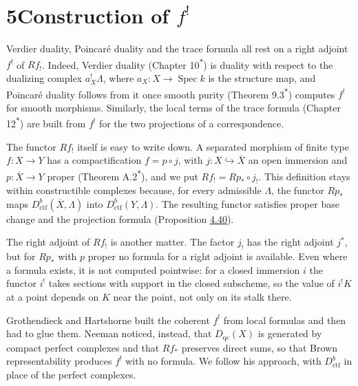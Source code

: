 \documentclass[11pt]{article}
\newcommand{\bpout}[1]{#1\textsuperscript{\hyperlink{bp-outside}{\ensuremath{\ast}}}}
\begin{document}
\section*{\texorpdfstring{5\quad Construction of $f^!$}{5 Construction of f!}}
\label{bp407}%
\label{bp408}%
Verdier duality, Poincaré duality and the trace formula all rest on a right adjoint \(f^!\) of \(Rf_!\). Indeed, Verdier duality (Chapter \bpout{10}) is duality with respect to the dualizing complex \(a_X^!\Lambda\), where \(a_X:X\to\operatorname{Spec}k\) is the structure map, and Poincaré duality follows from it once smooth purity (Theorem \bpout{9.3}) computes \(f^!\) for smooth morphisms. Similarly, the local terms of the trace formula (Chapter \bpout{12}) are built from \(f^!\) for the two projections of a correspondence.

The functor \(Rf_!\) itself is easy to write down. A separated morphism of finite type \(f:X\to Y\) has a compactification \(f=p\circ j\), with \(j:X\hookrightarrow\overline X\) an open immersion and \(p:\overline X\to Y\) proper (Theorem \bpout{A.2}), and we put \(Rf_!=Rp_*\circ j_!\). This definition stays within constructible complexes because, for every admissible \(\Lambda\), the functor \(Rp_*\) maps \(D^b_{\mathrm{ctf}}(\overline X,\Lambda)\) into \(D^b_{\mathrm{ctf}}(Y,\Lambda)\). The resulting functor satisfies proper base change and the projection formula (Proposition \hyperref[bp405]{4.40}).

The right adjoint of \(Rf_!\) is another matter. The factor \(j_!\) has the right adjoint \(j^*\), but for \(Rp_*\) with \(p\) proper no formula for a right adjoint is available. Even where a formula exists, it is not computed pointwise: for a closed immersion \(i\) the functor \(i^!\) takes sections with support in the closed subscheme, so the value of \(i^!K\) at a point depends on \(K\) near the point, not only on its stalk there.

Grothendieck and Hartshorne built the coherent \(f^!\) from local formulas and then had to glue them. Neeman noticed, instead, that \(D_{\mathrm{qc}}(X)\) is generated by compact perfect complexes and that \(Rf_*\) preserves direct sums, so that Brown representability produces \(f^!\) with no formula. We follow his approach, with \(D^b_{\mathrm{ctf}}\) in place of the perfect complexes.
\end{document}
